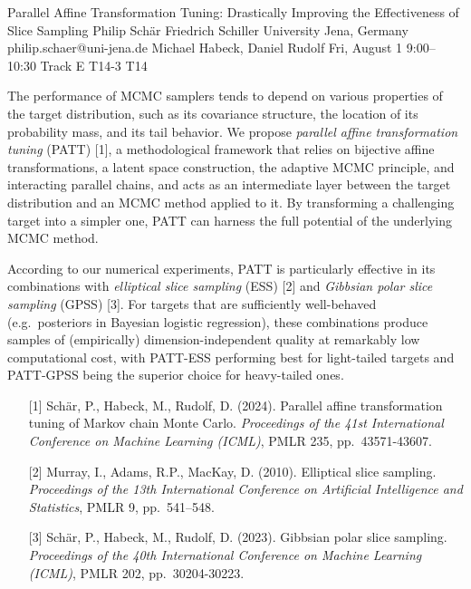 \begin{talk}
\end{talk}
\begin{talk}
  {Parallel Affine Transformation Tuning: Drastically Improving the Effectiveness of Slice Sampling}%
  {Philip Schär}%
  {Friedrich Schiller University Jena, Germany}%
  {philip.schaer@uni-jena.de}%
  {Michael Habeck, Daniel Rudolf}%
  {}%
  {Fri, August 1 9:00–10:30 Track E}%
  {T14-3}%
  {T14}%

The performance of MCMC samplers tends to depend on various properties of the target distribution, such as its covariance structure, the location of its probability mass, and its tail behavior. We propose \textit{parallel affine transformation tuning} (PATT) [1], a methodological framework that relies on bijective affine transformations, a latent space construction, the adaptive MCMC principle, and interacting parallel chains, and acts as an intermediate layer between the target distribution and an MCMC method applied to it. By transforming a challenging target into a simpler one, PATT can harness the full potential of the underlying MCMC method.

According to our numerical experiments, PATT is particularly effective in its combinations with \textit{elliptical slice sampling} (ESS) [2] and \textit{Gibbsian polar slice sampling} (GPSS) [3]. For targets that are sufficiently well-behaved (e.g.~posteriors in Bayesian logistic regression), these combinations produce samples of (empirically) dimension-independent quality at remarkably low computational cost, with PATT-ESS performing best for light-tailed targets and PATT-GPSS being the superior choice for heavy-tailed ones.

\medskip

\begin{enumerate}
	\item[{[1]}] Schär, P., Habeck, M., Rudolf, D. (2024). Parallel affine transformation tuning of Markov chain Monte Carlo. \textit{Proceedings of the 41st International Conference on Machine Learning (ICML)}, PMLR 235, pp.~43571-43607.
	\item[{[2]}] Murray, I., Adams, R.P., MacKay, D. (2010). Elliptical slice sampling. \textit{Proceedings of the 13th International Conference on Artificial Intelligence and Statistics}, PMLR 9, pp.~541--548.
	\item[{[3]}] Schär, P., Habeck, M., Rudolf, D. (2023). Gibbsian polar slice sampling. \textit{Proceedings of the 40th International Conference on Machine Learning (ICML)}, PMLR 202, pp.~30204-30223.
\end{enumerate}

\end{talk}

